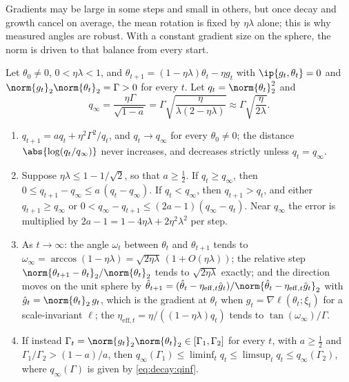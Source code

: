 \begin{refsection}
Gradients may be large in some steps and small in others, but once decay and growth cancel on average, the mean rotation is fixed by $\eta\lambda$ alone; this is why measured angles are robust. With a constant gradient size on the sphere, the norm is driven to that balance from every start.

\begin{theorem}\label{thm:decay:equilibrium}
Let $\theta_0\ne0$, $0<\eta\lambda<1$, and $\theta_{t+1}=(1-\eta\lambda)\theta_t-\eta g_t$ with $\ip{g_t,\theta_t}=0$ and $\norm{g_t}_2\norm{\theta_t}_2=\Gamma>0$ for every $t$. Let $q_t=\norm{\theta_t}_2^2$ and
\begin{equation}\label{eq:decay:qinf}
  q_\infty=\frac{\eta\Gamma}{\sqrt{1-a}}=\Gamma\sqrt{\frac{\eta}{\lambda(2-\eta\lambda)}}\approx\Gamma\sqrt{\frac{\eta}{2\lambda}} .
\end{equation}
\begin{enumerate}
\item $q_{t+1}=aq_t+\eta^2\Gamma^2/q_t$, and $q_t\to q_\infty$ for every $\theta_0\ne0$; the distance $\abs{\log(q_t/q_\infty)}$ never increases, and decreases strictly unless $q_t=q_\infty$.
\item Suppose $\eta\lambda\le1-1/\sqrt2$, so that $a\ge\frac12$. If $q_t\ge q_\infty$, then $0\le q_{t+1}-q_\infty\le a\,(q_t-q_\infty)$. If $q_t<q_\infty$, then $q_{t+1}>q_t$, and either $q_{t+1}\ge q_\infty$ or $0<q_\infty-q_{t+1}\le(2a-1)(q_\infty-q_t)$. Near $q_\infty$ the error is multiplied by $2a-1=1-4\eta\lambda+2\eta^2\lambda^2$ per step.
\item As $t\to\infty$: the angle $\omega_t$ between $\theta_t$ and $\theta_{t+1}$ tends to $\omega_\infty=\arccos(1-\eta\lambda)=\sqrt{2\eta\lambda}\,(1+O(\eta\lambda))$; the relative step $\norm{\theta_{t+1}-\theta_t}_2/\norm{\theta_t}_2$ tends to $\sqrt{2\eta\lambda}$ exactly; and the direction moves on the unit sphere by $\hat\theta_{t+1}=(\hat\theta_t-\eta_{\mathrm{eff},t}\hat g_t)/\norm{\hat\theta_t-\eta_{\mathrm{eff},t}\hat g_t}_2$ with $\hat g_t=\norm{\theta_t}_2\,g_t$, which is the gradient at $\hat\theta_t$ when $g_t=\nabla\ell(\theta_t;\xi_t)$ for a scale-invariant $\ell$; the  $\eta_{\mathrm{eff},t}=\eta/((1-\eta\lambda)q_t)$ tends to $\tan(\omega_\infty)/\Gamma$.
\item If instead $\Gamma_t=\norm{g_t}_2\norm{\theta_t}_2\in[\Gamma_1,\Gamma_2]$ for every $t$, with $a\ge\frac12$ and $\Gamma_1/\Gamma_2>(1-a)/a$, then $q_\infty(\Gamma_1)\le\liminf_tq_t\le\limsup_tq_t\le q_\infty(\Gamma_2)$, where $q_\infty(\Gamma)$ is given by \eqref{eq:decay:qinf}.
\end{enumerate}
\end{theorem}


\end{refsection}
